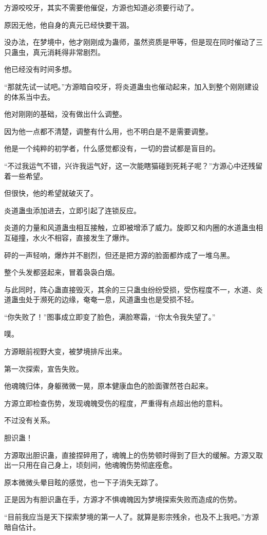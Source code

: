 \begin{this_body}
方源咬咬牙，其实不需要他催促，方源也知道必须要行动了。

原因无他，他自身的真元已经快要干涸。

没办法，在梦境中，他才刚刚成为蛊师，虽然资质是甲等，但是现在同时催动了三只蛊虫，真元消耗得非常剧烈。

他已经没有时间多想。

“那就先试一试吧。”方源暗自咬牙，将炎道蛊虫也催动起来，加入到整个刚刚建设的体系当中去。

他对刚刚的基础，没有做出什么调整。

因为他一点都不清楚，调整有什么用，也不明白是不是需要调整。

他是一个纯粹的初学者，什么感觉都没有，一切的尝试都是盲目的。

“不过我运气不错，兴许我运气好，这一次能瞎猫碰到死耗子呢？”方源心中还残留着一些希望。

但很快，他的希望就破灭了。

炎道蛊虫添加进去，立即引起了连锁反应。

炎道的力量和风道蛊虫相互接触，立即被增添了威力。旋即又和内圈的水道蛊虫相互碰撞，水火不相容，直接发生了爆炸。

砰的一声轻响，爆炸并不剧烈，但还是把方源的脸面都炸成了一堆乌黑。

整个头发都竖起来，冒着袅袅白烟。

与此同时，阵心蛊直接毁灭，其余的三只蛊虫纷纷受损，受伤程度不一，水道、炎道蛊虫处于濒死的边缘，奄奄一息，风道蛊虫也是受损不轻。

“你失败了！”图事成立即变了脸色，满脸寒霜，“你太令我失望了。”

噗。

方源眼前视野大变，被梦境排斥出来。

第一次探索，宣告失败。

他魂魄归体，身躯微微一晃，原本健康血色的脸面骤然苍白起来。

方源立即检查伤势，发现魂魄受伤的程度，严重得有点超出他的意料。

不过没有关系。

胆识蛊！

方源取出胆识蛊，直接捏碎用了，魂魄上的伤势顿时得到了巨大的缓解。方源又取出一只用在自己身上，顷刻间，他魂魄伤势彻底痊愈。

原本微微头晕目眩的感觉，也一下子消失无踪了。

正是因为有胆识蛊在手，方源才不惧魂魄因为梦境探索失败而造成的伤势。

“目前我应当是天下探索梦境的第一人了。就算是影宗残余，也及不上我吧。”方源暗自估计。


\end{this_body}
